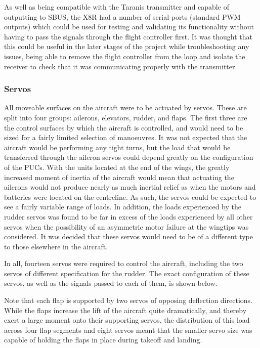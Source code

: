 \documentclass[../../main.tex]{subfiles}
\begin{document}
As well as being compatible with the Taranis transmitter and capable of outputting to SBUS, the X8R had a number of serial ports (standard PWM outputs) which could be used for testing and validating its functionality without having to pass the signals through the flight controller first.
It was thought that this could be useful in the later stages of the project while troubleshooting any issues, being able to remove the flight controller from the loop and isolate the receiver to check that it was communicating properly with the transmitter.

\subsubsection{Servos} \label{sec:design-process:revised-design:electronics:servos}

All moveable surfaces on the aircraft were to be actuated by servos.
These are split into four groups: ailerons, elevators, rudder, and flaps.
The first three are the control surfaces by which the aircraft is controlled, and would need to be sized for a fairly limited selection of manoeuvres.
It was not expected that the aircraft would be performing any tight turns, but the load that would be transferred through the aileron servos could depend greatly on the configuration of the PUCs.
With the units located at the end of the wings, the greatly increased moment of inertia of the aircraft would mean that actuating the ailerons would not produce nearly as much inertial relief as when the motors and batteries were located on the centreline.
As such, the servos could be expected to see a fairly variable range of loads.
In addition, the loads experienced by the rudder servos was found to be far in excess of the loads experienced by all other servos when the possibility of an asymmetric motor failure at the wingtips was considered.
It was decided that these servos would need to be of a different type to those elsewhere in the aircraft. 

In all, fourteen servos were required to control the aircraft, including the two servos of different specification for the rudder.
The exact configuration of these servos, as well as the signals passed to each of them, is shown below. 


Note that each flap is supported by two servos of opposing deflection directions.
While the flaps increase the lift of the aircraft quite dramatically, and thereby exert a large moment onto their supporting servos, the distribution of this load across four flap segments and eight servos meant that the smaller servo size was capable of holding the flaps in place during takeoff and landing. 
\end{document}

